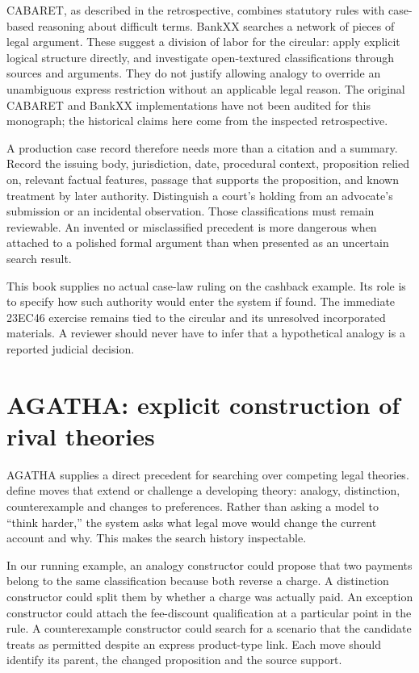 
CABARET, as described in the retrospective, combines statutory rules with
case-based reasoning about difficult terms. BankXX searches a network of pieces
of legal argument. These suggest a division of labor for the circular: apply
explicit logical structure directly, and investigate open-textured classifications
through sources and arguments. They do not justify allowing analogy to override
an unambiguous express restriction without an applicable legal reason. The
original CABARET and BankXX implementations have not been audited for this
monograph; the historical claims here come from the inspected retrospective.

A production case record therefore needs more than a citation and a summary.
Record the issuing body, jurisdiction, date, procedural context, proposition
relied on, relevant factual features, passage that supports the proposition, and
known treatment by later authority. Distinguish a court's holding from an
advocate's submission or an incidental observation. Those classifications must
remain reviewable. An invented or misclassified precedent is more dangerous when
attached to a polished formal argument than when presented as an uncertain search
result.

This book supplies no actual case-law ruling on the cashback example. Its role is
to specify how such authority would enter the system if found. The immediate
23EC46 exercise remains tied to the circular and its unresolved incorporated
materials. A reviewer should never have to infer that a hypothetical analogy is
a reported judicial decision.

\section{AGATHA: explicit construction of rival theories}
\label{merge:M05:03}


AGATHA supplies a direct precedent for searching over competing legal theories.
\citet[sections 2--4]{agatha2005} define moves that extend or challenge a developing
theory: analogy, distinction, counterexample and changes to preferences. Rather
than asking a model to ``think harder,'' the system asks what legal move would
change the current account and why. This makes the search history inspectable.

In our running example, an analogy constructor could propose that two payments
belong to the same classification because both reverse a charge. A distinction
constructor could split them by whether a charge was actually paid. An exception
constructor could attach the fee-discount qualification at a particular point in
the rule. A counterexample constructor could search for a scenario that the
candidate treats as permitted despite an express product-type link. Each move
should identify its parent, the changed proposition and the source support.

